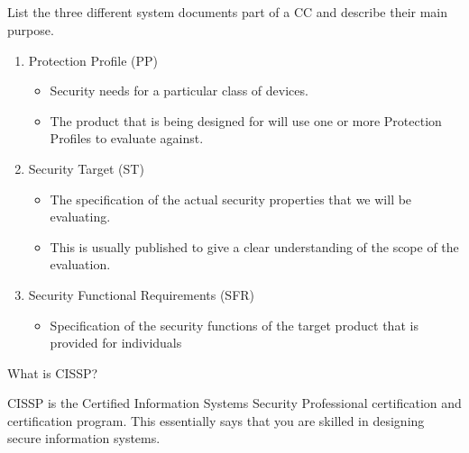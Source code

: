 \begin{questions}
\begin{parts}
  \part{} List the three different system documents part of a CC and describe their main purpose.
    \begin{solution}
      \begin{enumerate}[noitemsep]
      \item Protection Profile (PP)
        \begin{itemize}[noitemsep]
        \item Security needs for a particular class of devices.
        \item The product that is being designed for will use one or more Protection Profiles to evaluate against.
        \end{itemize}
      \item Security Target (ST)
        \begin{itemize}[noitemsep]
        \item The specification of the actual security properties that we will be evaluating.
        \item This is usually published to give a clear understanding of the scope of the evaluation.
        \end{itemize}
      \item Security Functional Requirements (SFR)
        \begin{itemize}[noitemsep]
        \item Specification of the security functions of the target product that is provided for individuals
        \end{itemize}
      \end{enumerate}
    \end{solution}
  \end{parts}

\question{} What is CISSP?\@
  \begin{solution}
    CISSP is the Certified Information Systems Security Professional certification and certification program.
    This essentially says that you are skilled in designing secure information systems.
  \end{solution}
\end{questions}

